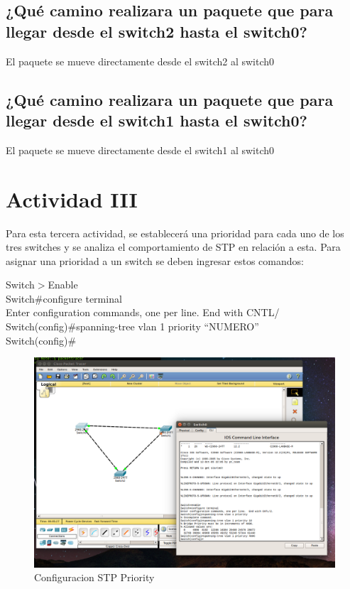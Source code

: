 \documentclass[spanish]{udpreport}
\begin{document}

\subsection{¿Qué camino realizara un paquete que para llegar desde el switch2 hasta el switch0?}
El paquete se mueve directamente desde el switch2 al switch0
\subsection{¿Qué camino realizara un paquete que para llegar desde el switch1 hasta el switch0?}
El paquete se mueve directamente desde el switch1 al switch0


\section{Actividad III}
Para esta tercera actividad, se establecerá una prioridad para cada uno de los tres switches y se analiza el comportamiento de STP en relación a esta. Para asignar una prioridad a un switch se deben ingresar estos comandos:

\begin{flushleft}	
	Switch$>$Enable\\
	Switch\#configure terminal\\
	Enter configuration commands, one per line. End with CNTL/\\
	Switch(config)\#spanning-tree vlan 1 priority “NUMERO”\\
	Switch(config)\#	\\
\end{flushleft}

\begin{figure}[H]
	\label{fig:Figura 2.3}
	\centering
	\includegraphics[scale=.25]{imagenes/A3_1e.png}
	\caption{Configuracion STP Priority}
\end{figure}
\end{document}

